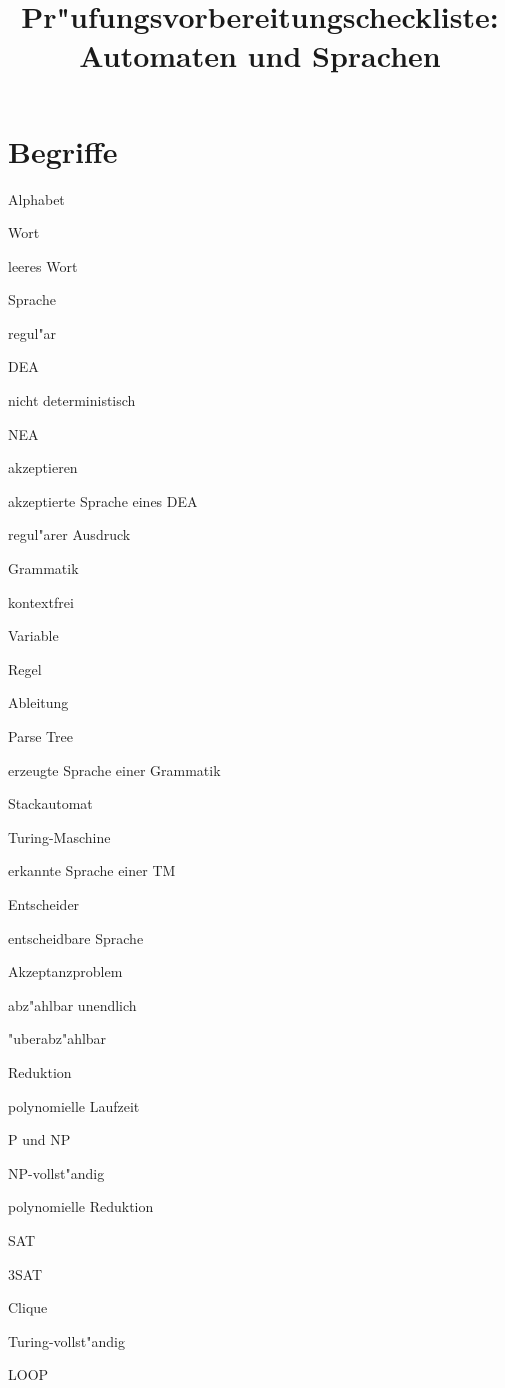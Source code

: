 \documentclass[a4paper,12pt,twocolumn]{article}
\begin{document}
\title{Pr"ufungsvorbereitungscheckliste:\\ Automaten und Sprachen}
\date{}
\maketitle
\section{Begriffe}
\begin{compactenum}
\item Alphabet
\item Wort
\item leeres Wort
\item Sprache
\item regul"ar
\item DEA
\item nicht deterministisch
\item NEA
\item akzeptieren
\item akzeptierte Sprache eines DEA
\item regul"arer Ausdruck
\item Grammatik
\item kontextfrei
\item Variable
\item Regel
\item Ableitung
\item Parse Tree
\item erzeugte Sprache einer Grammatik
\item Stackautomat
\item Turing-Maschine
\item erkannte Sprache einer TM
\item Entscheider
\item entscheidbare Sprache
\item Akzeptanzproblem
\item abz"ahlbar unendlich
\item "uberabz"ahlbar
\item Reduktion
\item polynomielle Laufzeit
\item P und NP
\item NP-vollst"andig
\item polynomielle Reduktion
\item SAT
\item 3SAT
\item Clique
\item Turing-vollst"andig
\item LOOP
\end{compactenum}
\vfill
\end{document}
